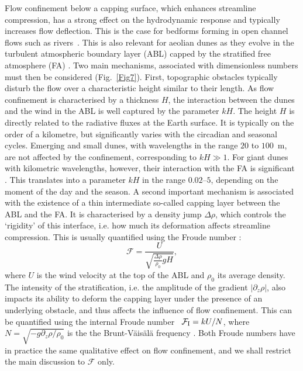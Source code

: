 Flow confinement below a capping surface, which enhances streamline compression, has a strong effect on the hydrodynamic response and typically increases flow deflection. This is the case for bedforms forming in open channel flows such as rivers~\citep{Fourriere2010, Unsworth2018}. This is also relevant for aeolian dunes as they evolve in the turbulent atmospheric boundary layer (ABL) capped by the stratified free atmosphere (FA) \citep{Andreotti2009}. Two main mechanisms, associated with dimensionless numbers must then be considered (Fig.~\ref{Fig7}). First, topographic obstacles typically disturb the flow over a characteristic height similar to their length. As flow confinement is characterised by a thickness $H$, the interaction between the dunes and the wind in the ABL is well captured by the parameter $k H$. The height $H$ is directly related to the radiative fluxes at the Earth surface. It is typically on the order of a kilometre, but significantly varies with the circadian and seasonal cycles. Emerging and small dunes, with wavelengths in the range $20$ to $100$~m, are not affected by the confinement, corresponding to $k H \gg 1$. For giant dunes with kilometric wavelengths, however, their interaction with the FA is significant \citep{Andreotti2009}. This translates into a parameter $kH$ in the range $0.02$--$5$, depending on the moment of the day and the season. A second important mechanism is associated with the existence of a thin intermediate so-called capping layer between the ABL and the FA. It is characterised by a density jump $\Delta\rho$, which controls the `rigidity' of this interface, i.e. how much its deformation affects streamline compression. This is usually quantified using the Froude number \citep{Vosper2004, Stull2006, Sheridan2006, Hunt2006, Jiang2014}:
%
\begin{equation}
\mathcal{F} = \displaystyle\frac{U}{\sqrt{\displaystyle\frac{\Delta\rho}{\rho_{0}}gH}},
\label{FroudeNumber}
\end{equation}
%
where $U$ is the wind velocity at the top of the ABL and $\rho_{0}$ its average density. The intensity of the stratification, i.e. the amplitude of the gradient $\left | \partial_z \rho \right|$, also impacts its ability to deform the capping layer under the presence of an underlying obstacle, and thus affects the influence of flow confinement. This can be quantified using the internal Froude number~\citep{Vosper2004, Stull2006, Sheridan2006, Hunt2006, Jiang2014} $\mathcal{F}_{\textup{I}} = k U/N$, where $N = \sqrt{-g \partial_z \rho / \rho_{0}}$ is the the Brunt-V\"ais\"al\"a frequency \citep{Stull1988}. Both Froude numbers have in practice the same qualitative effect on flow confinement, and we shall restrict the main discussion to $\mathcal{F}$ only.

